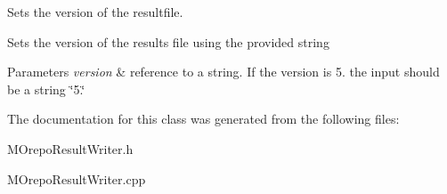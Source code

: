 Sets the version of the resultfile. 

Sets the version of the results file using the provided string 
\begin{DoxyParams}{Parameters}
{\em version} & reference to a string. If the version is 5. the input should be a string \char`\"{}5.\char`\"{} \\
\hline
\end{DoxyParams}


The documentation for this class was generated from the following files\+:\begin{DoxyCompactItemize}
\item 
M\+Orepo\+Result\+Writer.\+h\item 
M\+Orepo\+Result\+Writer.\+cpp\end{DoxyCompactItemize}
